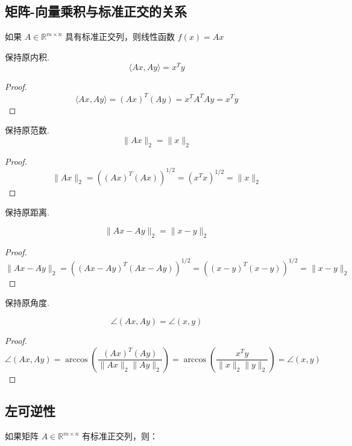 \subsection{矩阵-向量乘积与标准正交的关系}

如果 $ A \in \mathbb{R}^{m \times n} $ 具有标准正交列，则线性函数 $ f(x)=A x $

\begin{theorem}
    保持原内积.
    $$ \langle A x, A y\rangle=x^{T} y $$
\end{theorem}

\begin{proof}
    $$ \langle A x, A y\rangle=(A x)^{T}(A y)=x^{T} A^{T} A y=x^{T} y $$
\end{proof}


\begin{theorem}
    保持原范数.
    $$
    \|A x\|_{2}=\|x\|_{2}
    $$
\end{theorem}

\begin{proof}
   $$
\|A x\|_{2}=\left((A x)^{T}(A x)\right)^{1 / 2}=\left(x^{T} x\right)^{1 / 2}=\|x\|_{2}
$$
\end{proof}

\begin{theorem}
    保持原距离.

    $$
    \|A x-A y\|_{2}=\|x-y\|_{2}
    $$
\end{theorem}

\begin{proof}
   $$
\|A x-A y\|_{2}=\left((A x-A y)^{T}(A x-A y)\right)^{1 / 2}=\left((x-y)^{T}(x-y)\right)^{1 / 2}=\|x-y\|_{2}
$$
\end{proof}

\begin{theorem}
    保持原角度.

    $$ \angle(A x, A y)=\angle(x, y) $$
\end{theorem}

\begin{proof}
    $$ \angle(A x, A y)=\arccos \left(\frac{(A x)^{T}(A y)}{\|A x\|_{2}\|A y\|_{2}}\right)=\arccos \left(\frac{x^{T} y}{\|x\|_{2}\|y\|_{2}}\right)=\angle(x, y) $$
\end{proof}

\subsection{左可逆性}


如果矩阵 $ A \in \mathbb{R}^{m \times n} $ 有标准正交列，则：

